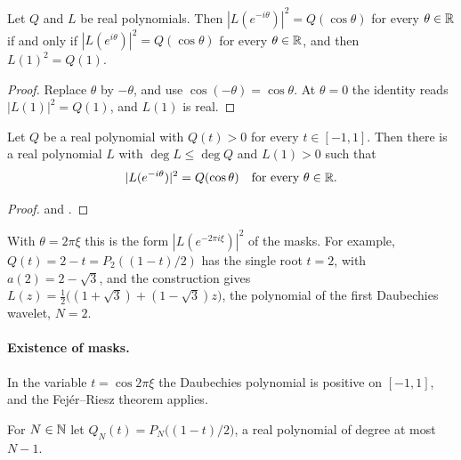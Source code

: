 \begin{lemma}
\label{lem:daub-fejer-riesz-readings}
\leanok
Let $Q$ and $L$ be real polynomials. Then $|L(e^{-i\theta})|^2 = Q(\cos\theta)$ for every
$\theta \in \mathbb{R}$ if and only if $|L(e^{i\theta})|^2 = Q(\cos\theta)$ for every $\theta \in \mathbb{R}$,
and then $L(1)^2 = Q(1)$.
\end{lemma}

\begin{proof}
\leanok
Replace $\theta$ by $-\theta$, and use $\cos(-\theta) = \cos\theta$. At $\theta = 0$ the identity
reads $|L(1)|^2 = Q(1)$, and $L(1)$ is real.
\end{proof}

\begin{proposition}
\label{prop:daub-fejer-riesz-exp-neg}
\leanok
Let $Q$ be a real polynomial with $Q(t) > 0$ for every $t \in [-1, 1]$. Then there is a real
polynomial $L$ with $\deg L \leq \deg Q$ and $L(1) > 0$ such that
\[
  |L(e^{-i\theta})|^2 = Q(\cos\theta) \quad\text{for every } \theta \in \mathbb{R} .
\]
\end{proposition}

\begin{proof}
\leanok
{}
 and .
\end{proof}

With $\theta = 2\pi\xi$ this is the form $|L(e^{-2\pi i \xi})|^2$ of the masks. For example,
$Q(t) = 2 - t = P_2((1 - t)/2)$ has the single root $t = 2$, with $a(2) = 2 - \sqrt 3$, and the
construction gives $L(z) = \frac12 \bigl((1 + \sqrt 3) + (1 - \sqrt 3) z\bigr)$, the polynomial of
the first Daubechies wavelet, $N = 2$.

\paragraph{Existence of masks.}
In the variable $t = \cos 2\pi\xi$ the Daubechies polynomial is positive on $[-1, 1]$, and the
Fej\'er--Riesz theorem applies.

\begin{definition}
\label{def:daub-cos-poly}
\leanok
{}
For $N \in \mathbb{N}$ let $Q_N(t) = P_N\bigl((1 - t)/2\bigr)$, a real polynomial of degree at most
$N - 1$.
\end{definition}

